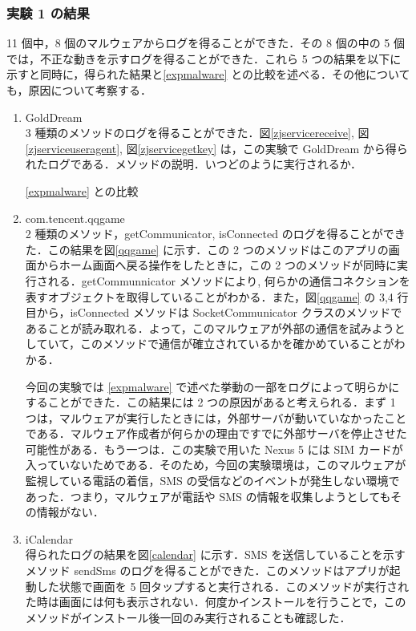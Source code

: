 \subsubsection{実験 1 の結果}
11 個中，8 個のマルウェアからログを得ることができた．その 8 個の中の 5 個では，不正な動きを示すログを得ることができた．これら 5 つの結果を以下に示すと同時に，得られた結果と\ref{expmalware} との比較を述べる．その他についても，原因について考察する．
\begin{enumerate}
\item GoldDream \mbox{}\\
	3 種類のメソッドのログを得ることができた．図\ref{zjservicereceive}, 図\ref{zjserviceuseragent}, 図\ref{zjservicegetkey} は，この実験で GoldDream から得られたログである．メソッドの説明．いつどのように実行されるか．
	
	\ref{expmalware} との比較
	
\item com.tencent.qqgame \mbox{}\\
	2 種類のメソッド，getCommunicator, isConnected のログを得ることができた．この結果を図\ref{qqgame} に示す．この 2 つのメソッドはこのアプリの画面からホーム画面へ戻る操作をしたときに，この 2 つのメソッドが同時に実行される．getCommunnicator メソッドにより, 何らかの通信コネクションを表すオブジェクトを取得していることがわかる．また，図\ref{qqgame} の 3,4 行目から，isConnected メソッドは SocketCommunicator クラスのメソッドであることが読み取れる．よって，このマルウェアが外部の通信を試みようとしていて，このメソッドで通信が確立されているかを確かめていることがわかる．
	
	今回の実験では \ref{expmalware} で述べた挙動の一部をログによって明らかにすることができた．この結果には 2 つの原因があると考えられる．まず 1 つは，マルウェアが実行したときには，外部サーバが動いていなかったことである．マルウェア作成者が何らかの理由ですでに外部サーバを停止させた可能性がある．もう一つは．この実験で用いた Nexus 5 には SIM カードが入っていないためである．そのため，今回の実験環境は，このマルウェアが監視している電話の着信，SMS の受信などのイベントが発生しない環境であった．つまり，マルウェアが電話や SMS の情報を収集しようとしてもその情報がない．
\item iCalendar \mbox{}\\
	得られたログの結果を図\ref{calendar} に示す．SMS を送信していることを示すメソッド sendSms のログを得ることができた．このメソッドはアプリが起動した状態で画面を 5 回タップすると実行される．このメソッドが実行された時は画面には何も表示されない．何度かインストールを行うことで，このメソッドがインストール後一回のみ実行されることも確認した．
	

\end{enumerate}
